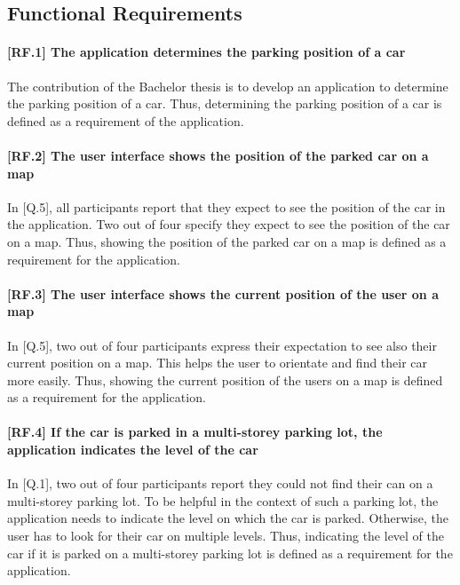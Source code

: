 \subsection{Functional Requirements}

\paragraph{[RF.1] The application determines the parking position of a car}
The contribution of the Bachelor thesis is to develop an application to determine the parking position of a car. Thus, determining the parking position of a car is defined as a requirement of the application.

\paragraph{[RF.2] The user interface shows the position of the parked car on a map}
In [Q.5], all participants report that they expect to see the position of the car in the application. Two out of four specify they expect to see the position of the car on a map. Thus, showing the position of the parked car on a map is defined as a requirement for the application. 

\paragraph{[RF.3] The user interface shows the current position of the user on a map}
In [Q.5], two out of four participants express their expectation to see also their current position on a map. This helps the user to orientate and find their car more easily. Thus, showing the current position of the users on a map is defined as a requirement for the application.

\paragraph{[RF.4] If the car is parked in a multi-storey parking lot, the application indicates the level of the car}
In [Q.1], two out of four participants report they could not find their can on a multi-storey parking lot. To be helpful in the context of such a parking lot, the application needs to indicate the level on which the car is parked. Otherwise, the user has to look for their car on multiple levels. Thus, indicating the level of the car if it is parked on a multi-storey parking lot is defined as a requirement for the application.

